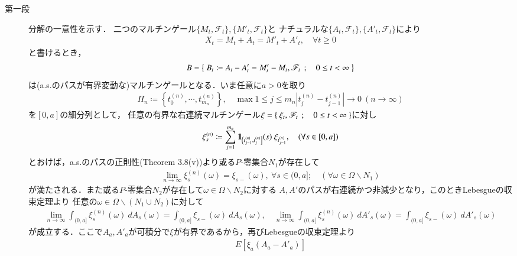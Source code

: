 	\begin{prf}\mbox{}
		\begin{description}
			\item[第一段]
				分解の一意性を示す．
				二つのマルチンゲール$\{M_t,\mathscr{F}_t\},\{M'_t,\mathscr{F}_t\}$と
				ナチュラルな$\{A_t,\mathscr{F}_t\},\{A'_t,\mathscr{F}_t\}$により
				\begin{align}
					X_t = M_t + A_t = M'_t + A'_t,
					\quad \forall t \geq 0
				\end{align}
				と書けるとき，
				\begin{align}
					B=\left\{\ B_t \coloneqq A_t - A'_t = M'_t - M_t,\mathscr{F}_t\ \, ; \quad 0 \leq t < \infty\ \right\}
				\end{align}
				は(a.s.のパスが有界変動な)マルチンゲールとなる．いま任意に$a > 0$を取り
				\begin{align}
					\Pi_n \coloneqq \left\{t_0^{(n)},\cdots,t_{m_n}^{(n)}\right\},
					\quad \max{1 \leq j \leq m_n}{\left| t_j^{(n)} - t_{j-1}^{(n)}\right|} \longrightarrow 0\ (n \longrightarrow \infty)
				\end{align}
				を$[0,a]$の細分列として，
				任意の有界な右連続マルチンゲール$\xi = \left\{\ \xi_t,\mathscr{F}_t\ \, ; \quad 0 \leq t < \infty\ \right\}$に対し
				\begin{align}
					\xi^{(n)}_s \coloneqq \sum_{j=1}^{m_n} \mbox{1}\hspace{-0.25em}\mbox{l}_{\left(t_{j-1}^{(n)},t_j^{(n)}\right]}(s)\ \xi_{t^{(n)}_{j-1}},
					\quad (\forall s \in [0,a])
				\end{align}
				とおけば，a.s.のパスの正則性(Theorem 3.8(v))より或る$P$-零集合$N_1$が存在して
				\begin{align}
					\lim_{n \to \infty} \xi^{(n)}_s(\omega) = \xi_{s-}(\omega),\ \forall s \in (0,a];
					\quad (\forall \omega \in \Omega \backslash N_1)
				\end{align}
				が満たされる．また或る$P$-零集合$N_2$が存在して$\omega \in \Omega \backslash N_2$に対する
				$A,A'$のパスが右連続かつ非減少となり，このときLebesgueの収束定理より
				任意の$\omega \in \Omega \backslash (N_1 \cup N_2)$に対して
				\begin{align}
					\lim_{n \to \infty} \int_{(0,a]} \xi^{(n)}_s(\omega)\ dA_s(\omega) = \int_{(0,a]} \xi_{s-}(\omega)\ dA_s(\omega),
					\quad \lim_{n \to \infty} \int_{(0,a]} \xi^{(n)}_s(\omega)\ dA'_s(\omega) = \int_{(0,a]} \xi_{s-}(\omega)\ dA'_s(\omega)
				\end{align}
				が成立する．ここで$A_a,A'_a$が可積分で$\xi$が有界であるから，再びLebesgueの収束定理より
				\begin{align}
					E\left[ \xi_a\left( A_a - A'_a \right) \right]

\end{align}
\end{description}
\end{prf}
